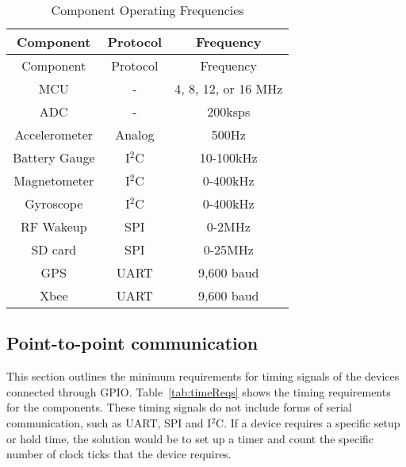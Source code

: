 \begin{center}
    \begin{longtable}{|c|c|c|}
    \caption{Component Operating Frequencies  \label{tab:compFreq}} \\
     \hline
    \rowcolor{Gray}
   Component & Protocol & Frequency \\
    \hline \hline \endfirsthead
    
         \hline
    \rowcolor{Gray}
    Component & Protocol & Frequency\\
    \hline \hline \endhead
    
    \endfoot
    MCU   & -     & 4, 8, 12, or 16 MHz \\ \hline
    ADC   & -     & 200ksps \\ \hline %
    Accelerometer & Analog & 500Hz \\ \hline
    Battery Gauge & I$^2$C & 10-100kHz \\ \hline
    Magnetometer & I$^2$C & 0-400kHz \\ \hline
    Gyroscope & I$^2$C   & 0-400kHz \\ \hline
    RF Wakeup & SPI   & 0-2MHz \\ \hline
    SD card & SPI   & 0-25MHz \\ \hline
    GPS   & UART  & 9,600 baud \\ \hline
    Xbee  & UART   & 9,600 baud \\ \hline
    \end{longtable}%

\end{center}%
  \vspace{-2cm}
  
  
  
\subsection{Point-to-point communication}
This section outlines the minimum requirements for timing signals of the devices connected through GPIO. Table~\ref{tab:timeReqs} shows the timing requirements for the components. These timing signals do not include forms of serial communication, such as UART, SPI and I$^2$C. If a device requires a specific setup or hold time, the solution would be to set up a timer and count the specific number of clock ticks that the device requires. 


